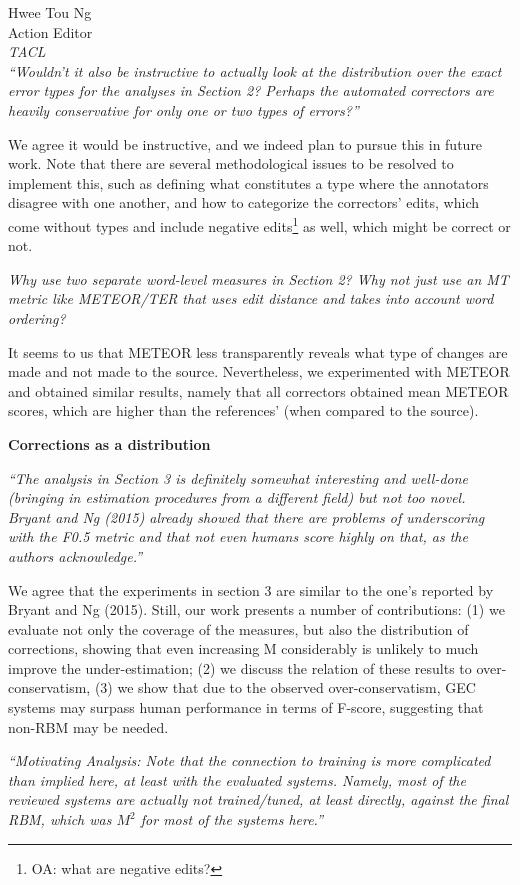 \documentclass[11pt,letterpaper]{letter}
\newcommand{\oa}[1]{\footnote{\color{red}OA: #1}}
\begin{document}
\begin{letter}{%
Hwee Tou Ng\\
Action Editor\\
{\em TACL}\\
}
\emph{``Wouldn't it also be instructive to actually look at the distribution
	over the exact error types for the analyses in Section 2? Perhaps the automated correctors are heavily conservative for only one or two types of errors?''
	}
	
We agree it would be instructive, and we indeed plan to pursue this in future work. Note that there are several methodological issues to be resolved to implement this, such as defining what constitutes a type where the annotators disagree with one another, and how to categorize the correctors' edits, {\color{red}which come without types and include negative edits\oa{what are negative edits?} as well, which might be correct or not.}
	
\emph{Why use two separate word-level measures in Section 2? Why not just use
	an MT metric like METEOR/TER that uses edit distance and takes into account
	word ordering?}

It seems to us that METEOR less transparently reveals what type of changes are made and not made to the source. Nevertheless, we experimented with METEOR and obtained similar results, namely that all correctors obtained mean METEOR scores, which are higher than the references' (when compared to the source).

{\bf Corrections as a distribution}

\emph{``The analysis in Section 3 is definitely somewhat interesting and
	well-done (bringing in estimation procedures from a different field) but not
	too novel. Bryant and Ng (2015) already showed that there are problems of
	underscoring with the F0.5 metric and that not even humans score highly on
	that, as the authors acknowledge.''
	}
	
We agree that the experiments in section 3 are similar to the one's reported by Bryant and Ng (2015). Still, our work presents a number of contributions: (1) we evaluate not only the coverage of the measures, but also the distribution of corrections, showing that even increasing M considerably is unlikely to much improve the under-estimation; (2) we discuss the relation of these results to over-conservatism, (3) we show that due to the observed over-conservatism, GEC systems may surpass human performance in terms of F-score, suggesting that non-RBM may be needed.

\emph{``Motivating Analysis: Note that the connection to training is more
	complicated than implied here, at least with the evaluated systems. Namely,
	most of the reviewed systems are actually not trained/tuned, at least
	directly, against the final RBM, which was $M^2$ for most of the systems here.''
	}
	

\end{letter}
\end{document}
